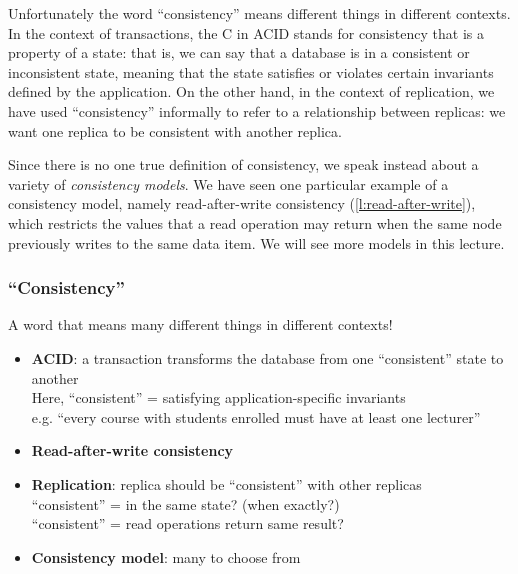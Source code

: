 Unfortunately the word ``consistency'' means different things in different contexts.
In the context of transactions, the C in ACID stands for consistency that is a property of a state: that is, we can say that a database is in a consistent or inconsistent state, meaning that the state satisfies or violates certain invariants defined by the application.
On the other hand, in the context of replication, we have used ``consistency'' informally to refer to a relationship between replicas: we want one replica to be consistent with another replica.

Since there is no one true definition of consistency, we speak instead about a variety of \emph{consistency models}.
We have seen one particular example of a consistency model, namely read-after-write consistency (\autoref{l:read-after-write}), which restricts the values that a read operation may return when the same node previously writes to the same data item.
We will see more models in this lecture.

\begin{frame}
    \label{s:consistency}
    \frametitle{``Consistency''}
    A word that means many different things in different contexts!\pause
    \begin{itemize}
        \item \textbf{ACID}: a transaction transforms the database from one ``consistent'' state to another\\[0.5em]\pause
            Here, ``consistent'' = satisfying application-specific invariants\\[0.5em]
            e.g. ``every course with students enrolled must have at least one lecturer''\\[0.5em]\pause
        \item \textbf{Read-after-write consistency}\\[0.5em]\pause
        \item \textbf{Replication}: replica should be ``consistent'' with other replicas\\[0.5em]\pause
            ``consistent'' = in the same state? (when exactly?)\\[0.5em]
            ``consistent'' = read operations return same result?\\[0.5em]
        \item \textbf{Consistency model}: many to choose from
    \end{itemize}
\end{frame}
\label{l:consistency}

